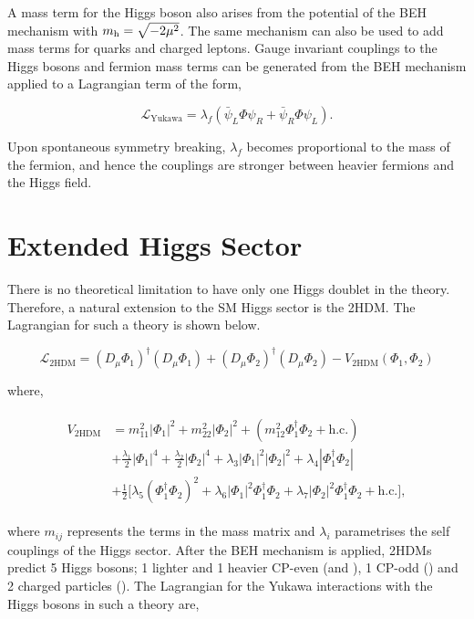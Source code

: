 A mass term for the Higgs boson also arises from the potential of the \ac{BEH} mechanism with $m_{{\text{h}}} = \sqrt{-2\mu^2}$. 
The same mechanism can also be used to add mass terms for quarks and charged leptons.
Gauge invariant couplings to the Higgs bosons and fermion mass terms can be generated from the \ac{BEH} mechanism applied to a Lagrangian term of the form,

\begin{equation}
\mathcal{L}_{\text{Yukawa}} = \lambda_f (\bar{\psi}_{L}\Phi\psi_{R} + \bar{\psi}_{R}\Phi\psi_{L}).
\end{equation}

Upon spontaneous symmetry breaking, $\lambda_{f}$ becomes proportional to the mass of the fermion, and hence the couplings are stronger between heavier fermions and the Higgs field.

\section{Extended Higgs Sector}

There is no theoretical limitation to have only one Higgs doublet in the theory.
Therefore, a natural extension to the \ac{SM} Higgs sector is the \ac{2HDM}.
The Lagrangian for such a theory is shown below.

\begin{equation}
\mathcal{L}_{\text{2HDM}} = (D_\mu \Phi_1)^{\dagger} (D_\mu \Phi_1) + (D_\mu \Phi_2)^{\dagger} (D_\mu \Phi_2) - V_{\text{2HDM}}(\Phi_1 ,\Phi_2)
\end{equation}

where,

\begin{align}
\label{eqn:lag_2hdm}
\begin{split}
V_{\text{2HDM}} &= m_{11}^{2}|\Phi_{1}|^2 + m_{22}^{2}|\Phi_{2}|^2 + (m_{12}^{2}\Phi_{1}^{\dagger}\Phi_{2} + \text{h.c.}) \\
&+ \frac{\lambda_1}{2}|\Phi_{1}|^4 + \frac{\lambda_2}{2}|\Phi_{2}|^4 + \lambda_3 |\Phi_{1}|^2 |\Phi_{2}|^2 + \lambda_4  |\Phi_{1}^{\dagger} \Phi_{2}| \\
&+ \frac{1}{2}\Big[ \lambda_5 (\Phi_{1}^{\dagger} \Phi_{2})^{2} + \lambda_6 |\Phi_{1}|^{2} \Phi_{1}^{\dagger} \Phi_{2} +  \lambda_7 |\Phi_{2}|^{2} \Phi_{1}^{\dagger} \Phi_{2} + \text{h.c.} \Big],
\end{split}
\end{align}

where $m_{ij}$ represents the terms in the mass matrix and $\lambda_i$ parametrises the self couplings of the Higgs sector. 
After the \ac{BEH} mechanism is applied, \ac{2HDM}s predict 5 Higgs bosons; 1 lighter and 1 heavier \ac{CP}-even (\Ph and \PH), 1 \ac{CP}-odd (\PA) and 2 charged particles (\PHc).
The Lagrangian for the Yukawa interactions with the Higgs bosons in such a theory are,


